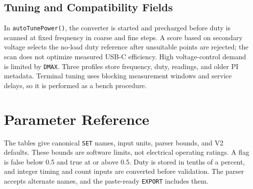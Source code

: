 \subsection{Tuning and Compatibility Fields}

In \texttt{autoTunePower()}, the converter is started and precharged before duty is scanned at fixed frequency in coarse and fine steps. A score based on secondary voltage selects the no-load duty reference after unsuitable points are rejected; the scan does not optimize measured USB-C efficiency. High voltage-control demand is limited by \texttt{DMAX}. Three profiles store frequency, duty, readings, and older PI metadata. Terminal tuning uses blocking measurement windows and service delays, so it is performed as a bench procedure.

\section{Parameter Reference}
\label{sec:app-fw-parameters}

The tables give canonical \texttt{SET} names, input units, parser bounds, and V2 defaults. These bounds are software limits, not electrical operating ratings. A flag is false below 0.5 and true at or above 0.5. Duty is stored in tenths of a percent, and integer timing and count inputs are converted before validation. The parser accepts alternate names, and the paste-ready \texttt{EXPORT} includes them.

